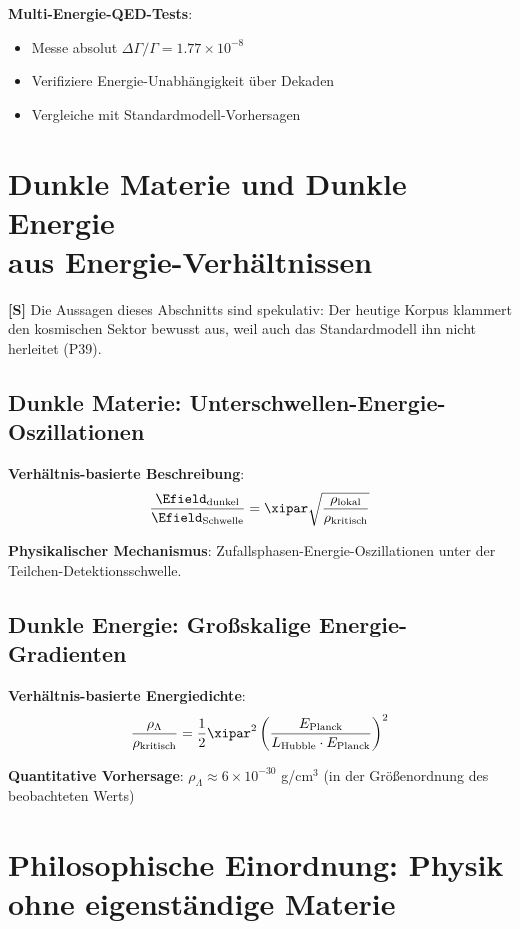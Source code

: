 	\textbf{Multi-Energie-QED-Tests}:
	\begin{itemize}
		\item Messe absolut $\Delta\Gamma/\Gamma = 1.77 \times 10^{-8}$
		\item Verifiziere Energie-Unabhängigkeit über Dekaden
		\item Vergleiche mit Standardmodell-Vorhersagen
	\end{itemize}
	
	\section{Dunkle Materie und Dunkle Energie\\ aus Energie-Verhältnissen}
	
	\textbf{[S]} Die Aussagen dieses Abschnitts sind spekulativ: Der heutige Korpus klammert den kosmischen Sektor bewusst aus, weil auch das Standardmodell ihn nicht herleitet (P39).
	
	\subsection{Dunkle Materie: Unterschwellen-Energie-Oszillationen}
	
	\textbf{Verhältnis-basierte Beschreibung}:
	\begin{equation}
		\frac{\Efield_{\text{dunkel}}}{\Efield_{\text{Schwelle}}} = \xipar \sqrt{\frac{\rho_{\text{lokal}}}{\rho_{\text{kritisch}}}}
	\end{equation}
	
	\textbf{Physikalischer Mechanismus}: Zufallsphasen-Energie-Oszillationen unter der Teilchen-Detektionsschwelle.
	
	\subsection{Dunkle Energie: Großskalige Energie-Gradienten}
	
	\textbf{Verhältnis-basierte Energiedichte}:
	\begin{equation}
		\frac{\rho_{\Lambda}}{\rho_{\text{kritisch}}} = \frac{1}{2} \xipar^2 \left(\frac{E_{\text{Planck}}}{L_{\text{Hubble}} \cdot E_{\text{Planck}}}\right)^2
	\end{equation}
	
	\textbf{Quantitative Vorhersage}: $\rho_{\Lambda} \approx 6 \times 10^{-30}$ g/cm$^3$ (in der Größenordnung des beobachteten Werts)

	
	\section{Philosophische Einordnung: Physik ohne eigenständige Materie}
	
